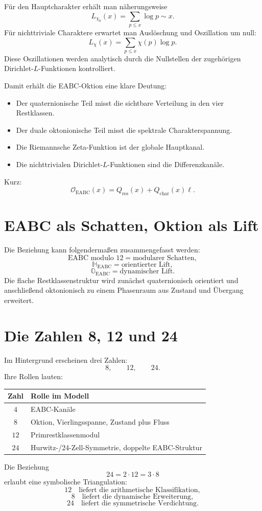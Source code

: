 \documentclass[11pt,a4paper]{article}
\theoremstyle{definition}
\theoremstyle{plain}
\newcommand{\HH}{\mathbb{H}}
\newcommand{\OO}{\mathbb{O}}
\newcommand{\EABC}{\mathrm{EABC}}
\begin{document}
	Für den Hauptcharakter erhält man näherungsweise
	\[
	L_{\chi_0}(x)=\sum_{p\le x}\log p\sim x.
	\]
	Für nichttriviale Charaktere erwartet man Auslöschung und Oszillation um null:
	\[
	L_\chi(x)=\sum_{p\le x}\chi(p)\log p.
	\]
	Diese Oszillationen werden analytisch durch die Nullstellen der zugehörigen Dirichlet-$L$-Funktionen kontrolliert.
	
	Damit erhält die EABC-Oktion eine klare Deutung:
	\begin{itemize}[leftmargin=2em]
		\item Der quaternionische Teil misst die sichtbare Verteilung in den vier Restklassen.
		\item Der duale oktonionische Teil misst die spektrale Charakterspannung.
		\item Die Riemannsche Zeta-Funktion ist der globale Hauptkanal.
		\item Die nichttrivialen Dirichlet-$L$-Funktionen sind die Differenzkanäle.
	\end{itemize}
	
	Kurz:
	\[
	\boxed{
		\mathcal O_{\EABC}(x)
		=
		Q_{\mathrm{res}}(x)+Q_{\mathrm{char}}(x)\ell
	}.
	\]
	
	\section{EABC als Schatten, Oktion als Lift}
	
	Die Beziehung kann folgendermaßen zusammengefasst werden:
	\[
	\text{EABC modulo }12
	=
	\text{modularer Schatten},
	\]
	\[
	\HH_{\EABC}
	=
	\text{orientierter Lift},
	\]
	\[
	\OO_{\EABC}
	=
	\text{dynamischer Lift}.
	\]
	Die flache Restklassenstruktur wird zunächst quaternionisch orientiert und anschließend oktonionisch zu einem Phasenraum aus Zustand und Übergang erweitert.
	
	\section{Die Zahlen 8, 12 und 24}
	
	Im Hintergrund erscheinen drei Zahlen:
	\[
	8,
	\qquad
	12,
	\qquad
	24.
	\]
	Ihre Rollen lauten:
	\begin{center}
		\begin{tabular}{cl}
			\toprule
			Zahl & Rolle im Modell\\
			\midrule
			$4$ & EABC-Kanäle\\
			$8$ & Oktion, Vierlingsspanne, Zustand plus Fluss\\
			$12$ & Primrestklassenmodul\\
			$24$ & Hurwitz-/24-Zell-Symmetrie, doppelte EABC-Struktur\\
			\bottomrule
		\end{tabular}
	\end{center}
	Die Beziehung
	\[
	24=2\cdot 12=3\cdot 8
	\]
	erlaubt eine symbolische Triangulation:
	\[
	12\quad\text{liefert die arithmetische Klassifikation},
	\]
	\[
	8\quad\text{liefert die dynamische Erweiterung},
	\]
	\[
	24\quad\text{liefert die symmetrische Verdichtung}.
	\]
	
\end{document}
